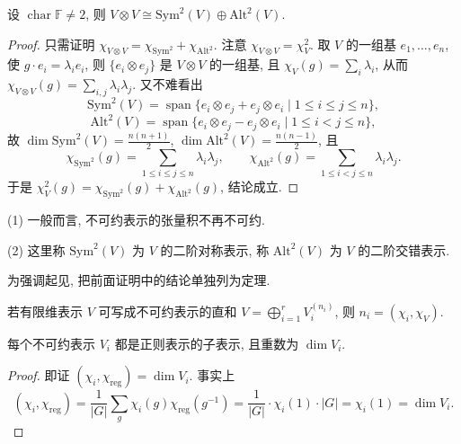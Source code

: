 \begin{proposition}\label{prop:sym-alt-decomp}
设 $\operatorname{char}\mathbb{F}\ne2$, 则
$V\otimes V\cong\mathrm{Sym}^2(V)\oplus\mathrm{Alt}^2(V)$.
\end{proposition}

\begin{proof}
只需证明 $\chi_{V\otimes V}=\chi_{\mathrm{Sym}^2}+\chi_{\mathrm{Alt}^2}$.
注意 $\chi_{V\otimes V}=\chi_V^2$. 取 $V$ 的一组基 $e_1,\dots,e_n$, 使
$g\cdot e_i=\lambda_ie_i$, 则 $\{e_i\otimes e_j\}$ 是 $V\otimes V$ 的一组基, 且
$\chi_V(g)=\sum_i\lambda_i$, 从而 $\chi_{V\otimes V}(g)=\sum_{i,j}\lambda_i\lambda_j$.
又不难看出
\[
  \mathrm{Sym}^2(V)=\operatorname{span}\{e_i\otimes e_j+e_j\otimes e_i\mid 1\le i\le j\le n\},
\]
\[
  \mathrm{Alt}^2(V)=\operatorname{span}\{e_i\otimes e_j-e_j\otimes e_i\mid 1\le i<j\le n\},
\]
故 $\dim\mathrm{Sym}^2(V)=\frac{n(n+1)}{2}$, $\dim\mathrm{Alt}^2(V)=\frac{n(n-1)}{2}$, 且
\[
  \chi_{\mathrm{Sym}^2}(g)=\sum_{1\le i\le j\le n}\lambda_i\lambda_j,\qquad
  \chi_{\mathrm{Alt}^2}(g)=\sum_{1\le i<j\le n}\lambda_i\lambda_j .
\]
于是 $\chi_V^2(g)=\chi_{\mathrm{Sym}^2}(g)+\chi_{\mathrm{Alt}^2}(g)$, 结论成立.
\end{proof}

\begin{remark}\label{rem:tensor-sym-alt}
\mbox{}\par\vspace{-0.2em}
(1) 一般而言, 不可约表示的张量积不再不可约.

(2) 这里称 $\mathrm{Sym}^2(V)$ 为 $V$ 的二阶对称表示, 称 $\mathrm{Alt}^2(V)$ 为
$V$ 的二阶交错表示.
\end{remark}

为强调起见, 把前面证明中的结论单独列为定理.

\begin{theorem}[表示的重数]\label{thm:multiplicity}
若有限维表示 $V$ 可写成不可约表示的直和
$V=\bigoplus_{i=1}^{r}V_i^{(n_i)}$, 则 $n_i=(\chi_i,\chi_V)$.
\end{theorem}

\begin{theorem}\label{thm:regular-contains}
每个不可约表示 $V_i$ 都是正则表示的子表示, 且重数为 $\dim V_i$.
\end{theorem}

\begin{proof}
即证 $(\chi_i,\chi_{\mathrm{reg}})=\dim V_i$. 事实上
\[
  (\chi_i,\chi_{\mathrm{reg}})=\frac{1}{|G|}\sum_{g}\chi_i(g)\chi_{\mathrm{reg}}(g^{-1})
  =\frac{1}{|G|}\cdot\chi_i(1)\cdot|G|=\chi_i(1)=\dim V_i .
\]
\end{proof}

